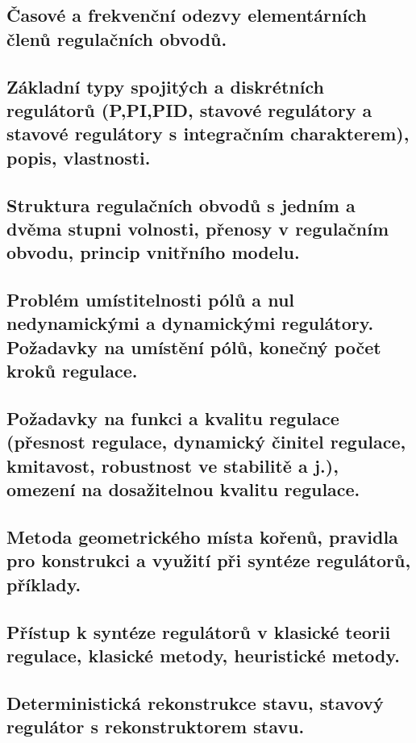 \subsection{Časové a frekvenční odezvy elementárních členů regulačních obvodů.}

\newpage
\subsection{Základní typy spojitých a diskrétních regulátorů (P,PI,PID, stavové regulátory a stavové regulátory s integračním charakterem), popis, vlastnosti.}

\newpage
\subsection{Struktura regulačních obvodů s jedním a dvěma stupni volnosti, přenosy v regulačním obvodu, princip vnitřního modelu.}

\newpage
\subsection{Problém umístitelnosti pólů a nul nedynamickými a dynamickými regulátory. Požadavky na umístění pólů, konečný počet kroků regulace.}

\newpage
\subsection{Požadavky na funkci a kvalitu regulace (přesnost regulace, dynamický činitel regulace, kmitavost, robustnost ve stabilitě a j.), omezení na dosažitelnou kvalitu regulace.}

\newpage
\subsection{Metoda geometrického místa kořenů, pravidla pro konstrukci a využití při syntéze regulátorů, příklady.}

\newpage
\subsection{Přístup k syntéze regulátorů v klasické teorii regulace, klasické metody, heuristické metody.}

\newpage
\subsection{Deterministická rekonstrukce stavu, stavový regulátor s rekonstruktorem stavu.}

